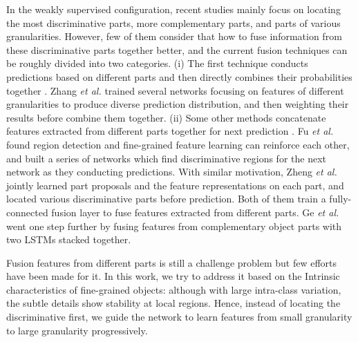 \documentclass{llncs}
\begin{document}
In the weakly supervised configuration, recent studies mainly focus on locating the most discriminative parts, more complementary parts, and parts of various granularities. However, few of them consider that how to fuse information from these discriminative parts together better, and the current fusion techniques can be roughly divided into two categories. (i) The first technique conducts predictions based on different parts and then directly combines their probabilities together \cite{zhang2019learning}. Zhang {\em et al.} \cite{zhang2019learning} trained several networks focusing on features of different granularities to produce diverse prediction distribution, and then weighting their results before combine them together. (ii) Some other methods concatenate features extracted from different parts together for next prediction  \cite{zheng2017learning,fu2017look,ge2019weakly,yang2018learning}. Fu {\em et al.} found region detection and ﬁne-grained feature learning can reinforce each other, and built a series of networks which find discriminative regions for the next network as they conducting predictions. With similar motivation, Zheng {\em et al.} \cite{zheng2017learning} jointly learned part proposals and the feature representations on each part, and located various discriminative parts before prediction. Both of them train a fully-connected fusion layer to fuse features extracted from different parts. Ge {\em et al.} \cite{ge2019weakly} went one step further by fusing features from complementary object parts with two LSTMs stacked together.

Fusion features from different parts is still a challenge problem but few efforts have been made for it. In this work, we try to address it based on the Intrinsic characteristics of fine-grained objects: although with large intra-class variation, the subtle details show stability at local regions. Hence, instead of locating the discriminative first, we guide the network to learn features from small granularity to large granularity progressively.
\end{document}
